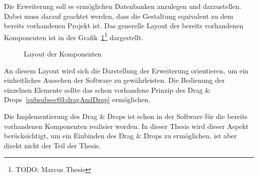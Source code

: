 Die Erweiterung soll es ermöglichen Datenbanken anzulegen und darzustellen. Dabei muss darauf geachtet werden, dass die Gestaltung equivalent zu dem bereits vorhandenen Projekt ist.
Das generelle Layout der bereits vorhandenen Komponenten ist in der Grafik~\ref{pic:layout}\footnote{TODO: Marcus Thesis}%
dargestellt.

\begin{figure}[ht]
        \centering
        \caption{Layout der Komponenten}
        \label{pic:layout}
\end{figure}

An diesem Layout wird sich die Darstellung der Erweiterung orientieren, um ein einheitliches Aussehen der Software zu gewährleisten. 
Die Bedienung der einzelnen Elemente sollte das schon vorhandene Prinzip des Drag \& Drops~\ref{subsubsec03:dragAndDrop} ermöglichen. 

Die Implementierung des Drag \& Drops ist schon in der Software für die bereits vorhandenen Komponenten realisier worden. In dieser Thesis wird dieser Aspekt berücksichtigt, um ein Einbinden des Drag \& Drops zu ermöglichen, ist aber direkt nicht der Teil der Thesis.

